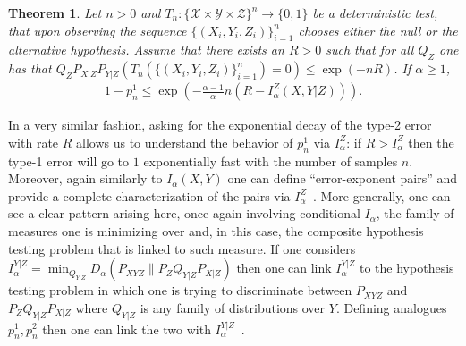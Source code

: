 \documentclass{article}
\newtheorem{theorem}{Theorem}
\numberwithin{theorem}{section}
\numberwithin{example}{section}
\numberwithin{remark}{section}
\numberwithin{definition}{section}
\newcommand{\X}{\mathcal{X}}
\newcommand{\Y}{\mathcal{Y}}
\newcommand{\Z}{\mathcal{Z}}
\begin{document}
\begin{theorem} Let $n>0$ and $T_n : \{\X\times\Y\times\Z\}^n \to \{0,1\}$ be a deterministic test, that upon observing the sequence $\{(X_i,Y_i,Z_i)\}_{i=1}^n$ chooses either the null or the alternative hypothesis.
 Assume that there exists an $ R>0$ such that for all  $Q_Z$ one has that $ Q_ZP_{X|Z}P_{Y|Z}(T_n(\{(X_i,Y_i,Z_i)\}_{i=1}^n) = 0) \leq \exp(-nR)$. If $\alpha\geq1$,
 \begin{align}
     1- p^1_n \leq \exp\left(-\frac{\alpha-1}{\alpha}n(R-I^Z_\alpha(X,Y|Z))\right).\label{eq:conditionalIAlphaHypothesisTesting}
 \end{align}
\end{theorem}
In a very similar fashion, asking for the exponential decay of the type-2 error with rate $R$ allows us to understand the behavior of $p_n^1$ via $I_\alpha^Z$: if $R>I_\alpha^Z$ then the type-1 error will go to $1$ exponentially fast with the number of samples $n$. Moreover, again similarly to $I_\alpha(X,Y)$ one can define ``error-exponent pairs'' and provide a complete characterization of the pairs via $I_\alpha^Z$~\cite{EspositoWG:21}. More generally, one can see a clear pattern arising here, once again involving conditional $I_\alpha$, the family of measures one is minimizing over and, in this case, the composite hypothesis testing problem that is linked to such measure. If one considers $I_\alpha^{Y|Z}=\min_{Q_{Y|Z}}D_\alpha(P_{XYZ}\|P_ZQ_{Y|Z}P_{X|Z})$ then one can link $I_\alpha^{Y|Z}$ to the hypothesis testing problem in which one is trying to discriminate between $P_{XYZ}$ and $P_ZQ_{Y|Z}P_{X|Z}$ where $Q_{Y|Z}$ is any family of distributions over $Y$. Defining analogues $p_n^1,p_n^2$ then one can link the two with $I_\alpha^{Y|Z}$~\cite{TomamichelH:18}.\fi
\end{document}
